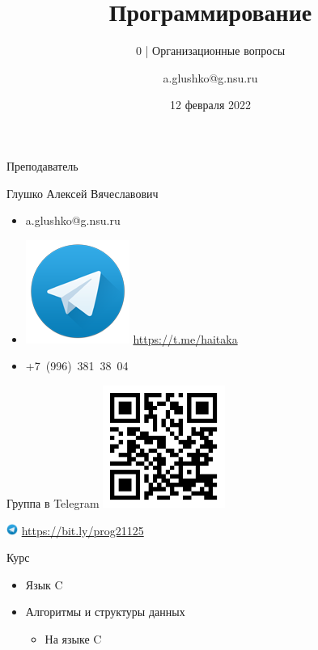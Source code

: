 \documentclass[aspectratio=169,14pt]{beamer}
\title{Программирование}
\subtitle{0 | Организационные вопросы}
\author{a.glushko@g.nsu.ru}
\date{12 февраля 2022}
\begin{document}
    \begin{frame}
        \titlepage
    \end{frame}

    \begin{frame}{Преподаватель}
        \begin{block}{Глушко Алексей Вячеславович}
            \begin{itemize}
                \item a.glushko@g.nsu.ru
                \item \includegraphics[height=\fontcharht\font`\B]{media/telegram128} \url{https://t.me/haitaka} %
                \item +7~(996)~381~38~04
            \end{itemize}
        \end{block}
    \end{frame}

    \begin{frame}{Группа в Telegram}
        \includegraphics[width=4cm]{media/telegram-invite-21125}

        \includegraphics[height=1em]{media/telegram128} \url{https://bit.ly/prog21125} %
    \end{frame}

    \begin{frame}{Курс}
        \begin{itemize}
            \item Язык C
            \item Алгоритмы и структуры данных
                \begin{itemize}
                    \item На языке C
                \end{itemize}
        \end{itemize}
    \end{frame}
\end{document}
